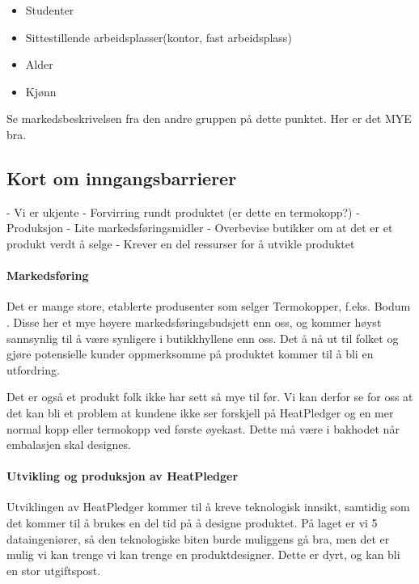 \begin{itemize}
	\item Studenter
	\item Sittestillende arbeidsplasser(kontor, fast arbeidsplass)
	\item Alder
	\item Kjønn
\end{itemize}
Se markedsbeskrivelsen fra den andre gruppen på dette punktet. Her er det MYE bra.
\subsection{Kort om inngangsbarrierer}
- Vi er ukjente
- Forvirring rundt produktet (er dette en termokopp?)
- Produksjon
- Lite markedsføringsmidler
- Overbevise butikker om at det er et produkt verdt å selge
- Krever en del ressurser for å utvikle produktet
\paragraph{Markedsføring}
Det er mange store, etablerte produsenter som selger Termokopper, f.eks. Bodum \cite{bodum}. Disse her et mye høyere markedsføringsbudsjett enn oss, og kommer høyst sannsynlig til å være synligere i butikkhyllene enn oss. Det å nå ut til folket og gjøre potensielle kunder oppmerksomme på produktet kommer til å bli en utfordring.


Det er også et produkt folk ikke har sett så mye til før. Vi kan derfor se for oss at det kan bli et problem at kundene ikke ser forskjell på HeatPledger og en mer normal kopp eller termokopp ved første øyekast. Dette må være i bakhodet når embalasjen skal designes.

\paragraph{Utvikling og produksjon av HeatPledger}
Utviklingen av HeatPledger kommer til å kreve teknologisk innsikt, samtidig som det kommer til å brukes en del tid på å designe produktet. På laget er vi 5 dataingeniører, så den teknologiske biten burde muliggens gå bra, men det er mulig vi kan trenge vi kan trenge en produktdesigner. Dette er dyrt, og kan bli en stor utgiftspost.


